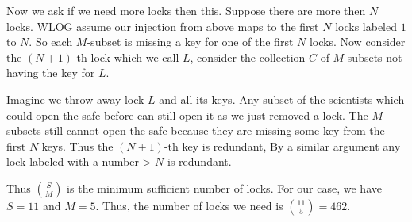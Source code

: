 \documentclass[a4paper, 12pt]{article}
\begin{document}
\begin{enumerate}
Now we ask if we need more locks then this. Suppose there are more then $N$ locks. WLOG assume our injection from above maps to the first $N$ locks labeled $1$ to $N$. So each $M$-subset is missing a key for one of the first $N$ locks. Now consider the $(N+1)$-th lock which we call $L$, consider the collection $C$ of $M$-subsets not having the key for $L$.

Imagine we throw away lock $L$ and all its keys. Any subset of the scientists which could open the safe before can still open it as we just removed a lock. The $M$-subsets still cannot open the safe because they are missing some key from the first $N$ keys. Thus the $(N+1)$-th key is redundant, By a similar argument any lock labeled with a number > $N$ is redundant.

Thus $S \choose M$ is the minimum sufficient number of locks. For our case, we have $S = 11$ and $M = 5$. Thus, the number of locks we need is ${11 \choose 5} = 462$.
    
    
    
    
    
    
\end{enumerate}
\end{document}
